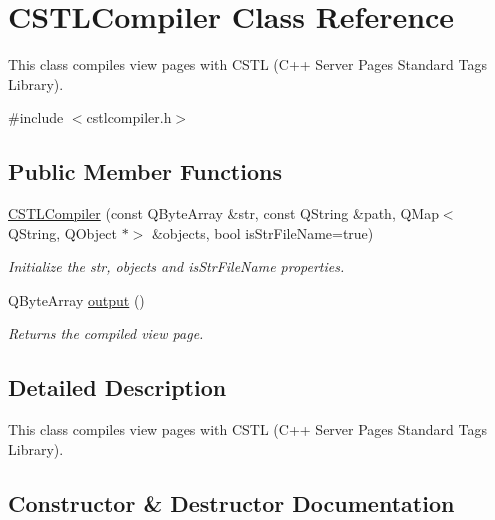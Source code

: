 \hypertarget{class_c_s_t_l_compiler}{}\section{C\+S\+T\+L\+Compiler Class Reference}
\label{class_c_s_t_l_compiler}


This class compiles view pages with C\+S\+TL (C++ Server Pages Standard Tags Library).  




{\ttfamily \#include $<$cstlcompiler.\+h$>$}

\subsection*{Public Member Functions}
\begin{DoxyCompactItemize}
\item 
\hyperlink{class_c_s_t_l_compiler_a2ff8b8d08a280dea2f9b7474a9759e8f}{C\+S\+T\+L\+Compiler} (const Q\+Byte\+Array \&str, const Q\+String \&path, Q\+Map$<$ Q\+String, Q\+Object $\ast$$>$ \&objects, bool is\+Str\+File\+Name=true)
\begin{DoxyCompactList}\small\item\em Initialize the str, objects and is\+Str\+File\+Name properties. \end{DoxyCompactList}\item 
Q\+Byte\+Array \hyperlink{class_c_s_t_l_compiler_a3cce5a503e81c5de099859fe0ae1c386}{output} ()
\begin{DoxyCompactList}\small\item\em Returns the compiled view page. \end{DoxyCompactList}\end{DoxyCompactItemize}


\subsection{Detailed Description}
This class compiles view pages with C\+S\+TL (C++ Server Pages Standard Tags Library). 

\subsection{Constructor \& Destructor Documentation}
\mbox{\label{class_c_s_t_l_compiler_a2ff8b8d08a280dea2f9b7474a9759e8f}} 
